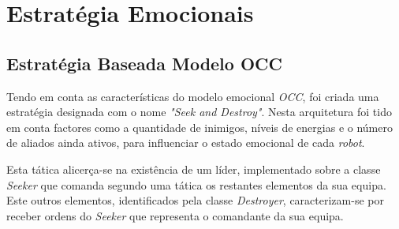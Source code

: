 \chapter{Estratégia Emocionais}

\section{Estratégia Baseada Modelo OCC}

Tendo em conta as características do modelo emocional \textit{OCC}, foi criada uma estratégia designada com o nome \textit{"Seek and Destroy"}. 
Nesta arquitetura foi tido em conta factores como a quantidade de inimigos, níveis de energias e o número de aliados ainda ativos, para influenciar o estado emocional de cada \textit{robot}. 

Esta tática alicerça-se na existência de um líder, implementado sobre a classe \textit{Seeker} que comanda segundo uma tática os restantes elementos da sua equipa. 
Este outros elementos, identificados pela classe \textit{Destroyer}, caracterizam-se por receber ordens do \textit{Seeker} que representa o comandante da sua equipa. 
\\

